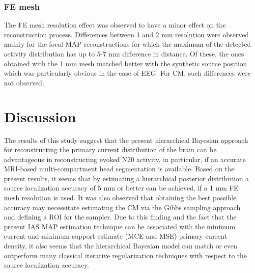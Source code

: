 \documentclass[5p]{elsarticle}
\begin{document}


\subsubsection{FE mesh}

The FE mesh resolution effect was observed to have a minor effect on the reconstruction process. Differences between 1 and 2 mm resolution were observed mainly for the focal MAP reconstructions for which the maximum of the detected activity distribution has up to 5-7 mm difference in distance.  Of these, the ones obtained with the 1 mm mesh matched better with the synthetic source position which was particularly obvious in the case of EEG. For CM, such differences were not observed. 

\section{Discussion}

The results of this study suggest that the  present hierarchical Bayesian approach for reconstructing the primary current distribution of the brain  \citep{calvetti2009, lucka2012} can be advantageous in  reconstructing evoked N20 activity, in particular, if an accurate MRI-based multi-compartment head segmentation is available. Based on the present results, it seems that by estimating a hierarchical posterior distribution a source localization accuracy of 5 mm or better can be achieved, if a 1 mm FE mesh resolution is used. It was also observed that obtaining the best possible accuracy may necessitate estimating the CM via the Gibbs sampling approach and defining a ROI for the sampler.  Due to this finding and the fact that the present IAS MAP estimation technique can be associated with the minimum current and minimum support estimate (MCE and MSE) \cite{uutela1999visualization,nagarajan2006controlled}
primary current density, it also seems that the hierarchical Bayesian model can match or even outperform many classical iterative regularization techniques with respect to the source localization accuracy. 
\end{document}
